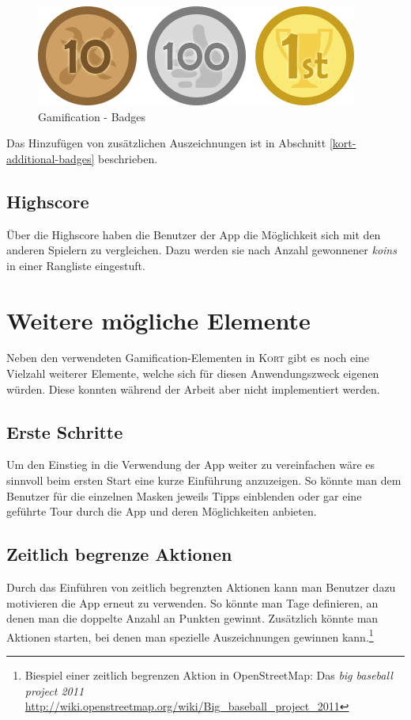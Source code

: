\begin{figure}[H]
	\centering
	\includegraphics[scale=0.7]{images/gamification/gamification-badges}
	\caption{Gamification - Badges}
	\label{gamification-badges}
\end{figure}

Das Hinzufügen von zusätzlichen Auszeichnungen ist in Abschnitt \ref{kort-additional-badges} beschrieben.

\subsection{Highscore}
Über die Highscore haben die Benutzer der App die Möglichkeit sich mit den anderen Spielern zu vergleichen.
Dazu werden sie nach Anzahl gewonnener \emph{koins} in einer Rangliste eingestuft.

\section{Weitere mögliche Elemente}
Neben den verwendeten Gamification-Elementen in \textsc{Kort} gibt es noch eine Vielzahl weiterer Elemente, welche sich für diesen Anwendungszweck eigenen würden.
Diese konnten während der Arbeit aber nicht implementiert werden.

\subsection{Erste Schritte}
Um den Einstieg in die Verwendung der App weiter zu vereinfachen wäre es sinnvoll beim ersten Start eine kurze Einführung anzuzeigen.
So könnte man dem Benutzer für die einzelnen Masken jeweils Tipps einblenden oder gar eine geführte Tour durch die App und deren Möglichkeiten anbieten.

\subsection{Zeitlich begrenze Aktionen}
Durch das Einführen von zeitlich begrenzten Aktionen kann man Benutzer dazu motivieren die App erneut zu verwenden.
So könnte man Tage definieren, an denen man die doppelte Anzahl an Punkten gewinnt.
Zusätzlich könnte man Aktionen starten, bei denen man spezielle Auszeichnungen gewinnen kann.\footnote{Biespiel einer zeitlich begrenzen Aktion in \gls{OpenStreetMap}: Das \emph{big baseball project 2011} \url{http://wiki.openstreetmap.org/wiki/Big_baseball_project_2011}}

